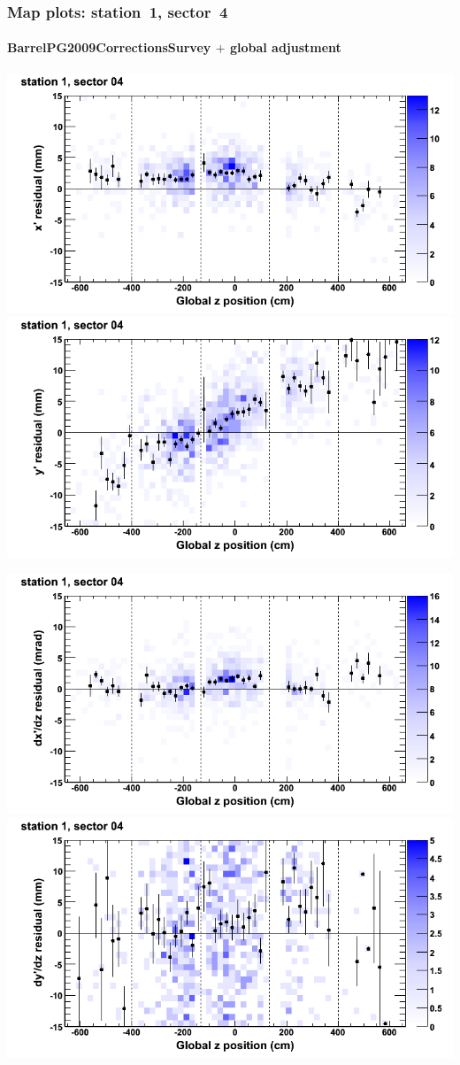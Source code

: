 \documentclass[compress]{beamer}
\begin{document}
\begin{frame}
\frametitle{Map plots: station~1, sector~4}
\framesubtitle{BarrelPG2009CorrectionsSurvey $+$ global adjustment}
\includegraphics[width=0.5\linewidth]{mapplots_re01/DTvsz_st1sec04_x.png}
\includegraphics[width=0.5\linewidth]{mapplots_re01/DTvsz_st1sec04_y.png}

\includegraphics[width=0.5\linewidth]{mapplots_re01/DTvsz_st1sec04_dxdz.png}
\includegraphics[width=0.5\linewidth]{mapplots_re01/DTvsz_st1sec04_dydz.png}
\end{frame}
\end{document}
